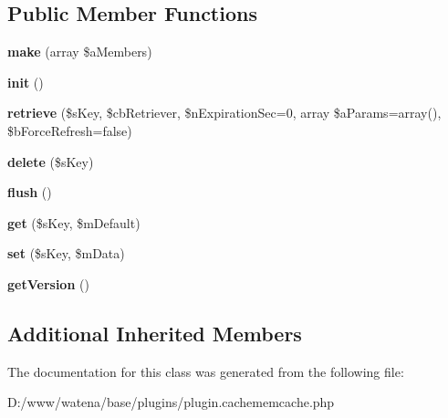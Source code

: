 \subsection*{Public Member Functions}
\begin{DoxyCompactItemize}
\item 
\hypertarget{class_cache_memcache_ab4e48519dc8d115f51616f893ef02bb2}{{\bfseries make} (array \$a\-Members)}\label{class_cache_memcache_ab4e48519dc8d115f51616f893ef02bb2}

\item 
\hypertarget{class_cache_memcache_a8f3bf0dc9b1ef0a7bda160aeaa07598a}{{\bfseries init} ()}\label{class_cache_memcache_a8f3bf0dc9b1ef0a7bda160aeaa07598a}

\item 
\hypertarget{class_cache_memcache_a1a38e63ca09ab1878af12bb25b3df142}{{\bfseries retrieve} (\$s\-Key, \$cb\-Retriever, \$n\-Expiration\-Sec=0, array \$a\-Params=array(), \$b\-Force\-Refresh=false)}\label{class_cache_memcache_a1a38e63ca09ab1878af12bb25b3df142}

\item 
\hypertarget{class_cache_memcache_a3cdd59fd28dcb1ec1ec1f7dc0ae55bbe}{{\bfseries delete} (\$s\-Key)}\label{class_cache_memcache_a3cdd59fd28dcb1ec1ec1f7dc0ae55bbe}

\item 
\hypertarget{class_cache_memcache_a02c7bf6680c1cc42a80138bd9d351d49}{{\bfseries flush} ()}\label{class_cache_memcache_a02c7bf6680c1cc42a80138bd9d351d49}

\item 
\hypertarget{class_cache_memcache_a065f2c605c30380a231c9b35a5e3ddbd}{{\bfseries get} (\$s\-Key, \$m\-Default)}\label{class_cache_memcache_a065f2c605c30380a231c9b35a5e3ddbd}

\item 
\hypertarget{class_cache_memcache_af866c6166619630b68ea7cafb317b2a3}{{\bfseries set} (\$s\-Key, \$m\-Data)}\label{class_cache_memcache_af866c6166619630b68ea7cafb317b2a3}

\item 
\hypertarget{class_cache_memcache_a1c5b524dd78ecba49866868949dcd575}{{\bfseries get\-Version} ()}\label{class_cache_memcache_a1c5b524dd78ecba49866868949dcd575}

\end{DoxyCompactItemize}
\subsection*{Additional Inherited Members}


The documentation for this class was generated from the following file\-:\begin{DoxyCompactItemize}
\item 
D\-:/www/watena/base/plugins/plugin.\-cachememcache.\-php\end{DoxyCompactItemize}
